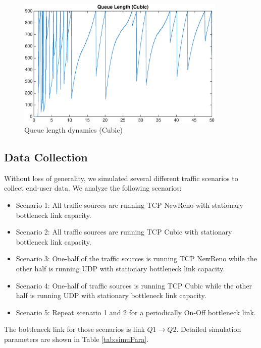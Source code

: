 \begin{figure}
\centering
\includegraphics[width=10cm]{QueueLengthCubic.eps}
\caption{Queue length dynamics (Cubic)}
\label{queuelengthCubic}
\end{figure}


\subsection{Data Collection}
Without loss of generality, we simulated several different traffic scenarios to collect end-user data. We analyze the following scenarios: 
\begin{itemize}
    \item Scenario 1: All traffic sources are running TCP NewReno with stationary bottleneck link capacity.
    \item Scenario 2: All traffic sources are running TCP Cubic with stationary bottleneck link capacity.
    \item Scenario 3: One-half of the traffic sources is running TCP NewReno while the other half is running UDP with stationary bottleneck link capacity.
    \item Scenario 4: One-half of traffic sources is running TCP Cubic while the other half is running UDP with stationary bottleneck link capacity.
    \item Scenario 5: Repeat scenario 1 and 2 for a periodically On-Off bottleneck link.
\end{itemize}
The bottleneck link for those scenarios is link $Q1 \to Q2$. Detailed simulation parameters are shown in Table \ref{tab:simuPara}.


